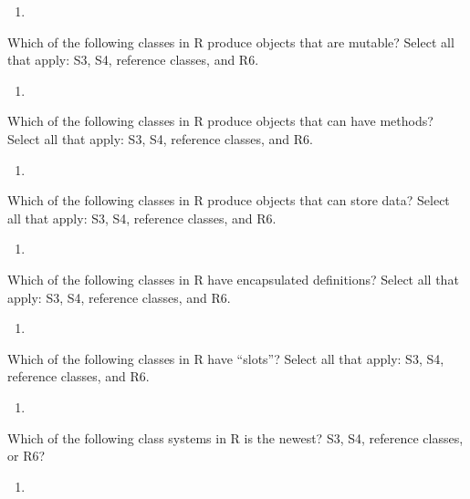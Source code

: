 \documentclass[12pt,krantz2]{krantz}
\begin{document}
\begin{enumerate}
\def\labelenumi{\arabic{enumi}.}
\item
\end{enumerate}

Which of the following classes in R produce objects that are mutable? Select all that apply: S3, S4, reference classes, and R6.

\begin{enumerate}
\def\labelenumi{\arabic{enumi}.}
\setcounter{enumi}{1}
\item
\end{enumerate}

Which of the following classes in R produce objects that can have methods? Select all that apply: S3, S4, reference classes, and R6.

\begin{enumerate}
\def\labelenumi{\arabic{enumi}.}
\setcounter{enumi}{2}
\item
\end{enumerate}

Which of the following classes in R produce objects that can store data? Select all that apply: S3, S4, reference classes, and R6.

\begin{enumerate}
\def\labelenumi{\arabic{enumi}.}
\setcounter{enumi}{3}
\item
\end{enumerate}

Which of the following classes in R have encapsulated definitions? Select all that apply: S3, S4, reference classes, and R6.

\begin{enumerate}
\def\labelenumi{\arabic{enumi}.}
\setcounter{enumi}{4}
\item
\end{enumerate}

Which of the following classes in R have ``slots''? Select all that apply: S3, S4, reference classes, and R6.

\begin{enumerate}
\def\labelenumi{\arabic{enumi}.}
\setcounter{enumi}{5}
\item
\end{enumerate}

Which of the following class systems in R is the newest? S3, S4, reference classes, or R6?

\begin{enumerate}
\def\labelenumi{\arabic{enumi}.}
\setcounter{enumi}{6}
\item
\end{enumerate}
\end{document}
